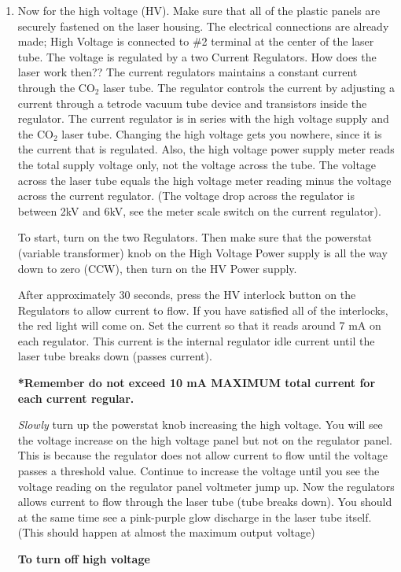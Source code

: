 \documentclass{../lab}
\begin{document}
\begin{enumerate}
    \item Now for the high voltage (HV). Make sure that all of the plastic panels are securely fastened on the laser housing. The electrical connections are already made; High Voltage is connected to \#2 terminal at the center of the laser tube. The voltage is regulated by a two Current Regulators. How does the laser work then?? The current regulators maintains a constant current through the CO$_2$ laser tube. The regulator controls the current by adjusting a current through a tetrode vacuum tube device and transistors inside the regulator. The current regulator is in series with the high voltage supply and the CO$_2$ laser tube. Changing the high voltage gets you nowhere, since it is the current that is regulated. Also, the high voltage power supply meter reads the total supply voltage only, not the voltage across the tube. The voltage across the laser tube equals the high voltage meter reading minus the voltage across the current regulator. (The voltage drop across the regulator is between 2kV and 6kV, see the meter scale switch on the current regulator).
    
    To start, turn on the two Regulators. Then make sure that the powerstat (variable transformer) knob on the High Voltage Power supply is all the way down to zero (CCW), then turn on the HV Power supply.
    
    After approximately 30 seconds, press the HV interlock button on the Regulators to allow current to flow. If you have satisfied all of the interlocks, the red light will come on. Set the current so that it reads around 7 mA on each regulator. This current is the internal regulator idle current until the laser tube breaks down (passes current).
    
    \textbf{*Remember do not exceed 10 mA MAXIMUM total current for each current regular.}
    
    \emph{Slowly} turn up the powerstat knob increasing the high voltage. You will see the voltage increase on the high voltage panel but not on the regulator panel. This is because the regulator does not allow current to flow until the voltage passes a threshold value. Continue to increase the voltage until you see the voltage reading on the regulator panel voltmeter jump up. Now the regulators allows current to flow through the laser tube (tube breaks down). You should at the same time see a pink-purple glow discharge in the laser tube itself. (This should happen at almost the maximum output voltage)

    \textbf{To turn off high voltage}


\end{enumerate}
\end{document}
